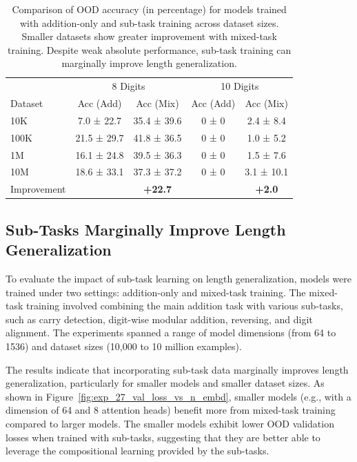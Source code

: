 \begin{table}[!h]
    \centering
    \caption{Comparison of OOD accuracy (in percentage) for models trained with addition-only and sub-task training across dataset sizes. Smaller datasets show greater improvement with mixed-task training. Despite weak absolute performance, sub-task training can marginally improve length generalization.}
    \label{tab:subtask_results}
    \begin{tabular}{lcccc}
                    & \multicolumn{2}{c}{8 Digits} & \multicolumn{2}{c}{10 Digits}                             \\
        Dataset     & Acc (Add)                    & Acc (Mix)                     & Acc (Add) & Acc (Mix)     \\
        \midrule
        10K         & 7.0 ± 22.7                   & 35.4 ± 39.6                   & 0 ± 0     & 2.4 ± 8.4     \\
        100K        & 21.5 ± 29.7                  & 41.8 ± 36.5                   & 0 ± 0     & 1.0 ± 5.2     \\
        1M          & 16.1 ± 24.8                  & 39.5 ± 36.3                   & 0 ± 0     & 1.5 ± 7.6     \\
        10M         & 18.6 ± 33.1                  & 37.3 ± 37.2                   & 0 ± 0     & 3.1 ± 10.1    \\
        \midrule
        Improvement &                              & \textbf{+22.7}                &           & \textbf{+2.0} \\
        \bottomrule
    \end{tabular}
\end{table}

\subsection{Sub-Tasks Marginally Improve Length Generalization}

To evaluate the impact of sub-task learning on length generalization, models were trained under two settings: addition-only and mixed-task training. The mixed-task training involved combining the main addition task with various sub-tasks, such as carry detection, digit-wise modular addition, reversing, and digit alignment. The experiments spanned a range of model dimensions (from 64 to 1536) and dataset sizes (10,000 to 10 million examples).

The results indicate that incorporating sub-task data marginally improves length generalization, particularly for smaller models and smaller dataset sizes. As shown in Figure~\ref{fig:exp_27_val_loss_vs_n_embd}, smaller models (e.g., with a dimension of 64 and 8 attention heads) benefit more from mixed-task training compared to larger models. The smaller models exhibit lower OOD validation losses when trained with sub-tasks, suggesting that they are better able to leverage the compositional learning provided by the sub-tasks.

